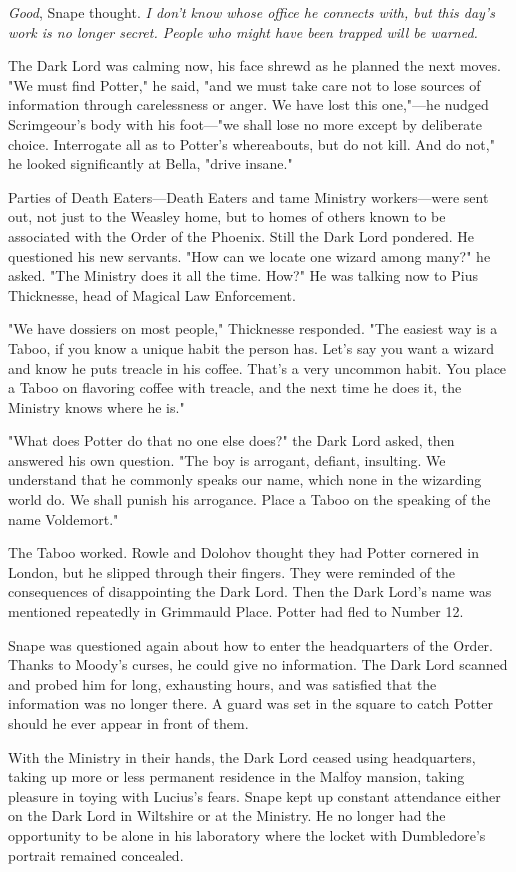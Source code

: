 \emph{Good}, Snape thought. \emph{I don't know whose office he connects with, but this day's work is no longer secret. People who might have been trapped will be warned.}

The Dark Lord was calming now, his face shrewd as he planned the next moves. "We must find Potter," he said, "and we must take care not to lose sources of information through carelessness or anger. We have lost this one,"—he nudged Scrimgeour's body with his foot—"we shall lose no more except by deliberate choice. Interrogate all as to Potter's whereabouts, but do not kill. And do not," he looked significantly at Bella, "drive insane."

Parties of Death Eaters—Death Eaters and tame Ministry workers—were sent out, not just to the Weasley home, but to homes of others known to be associated with the Order of the Phoenix. Still the Dark Lord pondered. He questioned his new servants. "How can we locate one wizard among many?" he asked. "The Ministry does it all the time. How?" He was talking now to Pius Thicknesse, head of Magical Law Enforcement.

"We have dossiers on most people," Thicknesse responded. "The easiest way is a Taboo, if you know a unique habit the person has. Let's say you want a wizard and know he puts treacle in his coffee. That's a very uncommon habit. You place a Taboo on flavoring coffee with treacle, and the next time he does it, the Ministry knows where he is."

"What does Potter do that no one else does?" the Dark Lord asked, then answered his own question. "The boy is arrogant, defiant, insulting. We understand that he commonly speaks our name, which none in the wizarding world do. We shall punish his arrogance. Place a Taboo on the speaking of the name Voldemort."

The Taboo worked. Rowle and Dolohov thought they had Potter cornered in London, but he slipped through their fingers. They were reminded of the consequences of disappointing the Dark Lord. Then the Dark Lord's name was mentioned repeatedly in Grimmauld Place. Potter had fled to Number 12.

Snape was questioned again about how to enter the headquarters of the Order. Thanks to Moody's curses, he could give no information. The Dark Lord scanned and probed him for long, exhausting hours, and was satisfied that the information was no longer there. A guard was set in the square to catch Potter should he ever appear in front of them.

With the Ministry in their hands, the Dark Lord ceased using headquarters, taking up more or less permanent residence in the Malfoy mansion, taking pleasure in toying with Lucius's fears. Snape kept up constant attendance either on the Dark Lord in Wiltshire or at the Ministry. He no longer had the opportunity to be alone in his laboratory where the locket with Dumbledore's portrait remained concealed.

